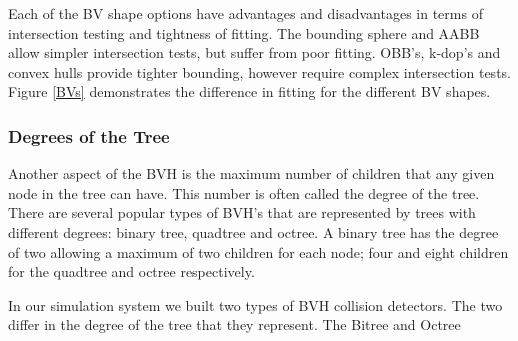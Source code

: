     Each of the BV shape options have advantages and disadvantages in terms of intersection testing and tightness of fitting. The bounding sphere and AABB allow simpler intersection tests, but suffer from poor fitting. OBB's, k-dop's and convex hulls provide tighter bounding, however require complex intersection tests. Figure \ref{BVs} demonstrates the difference in fitting for the different BV shapes.

    \subsubsection{Degrees of the Tree}
    Another aspect of the BVH is the maximum number of children that any given node in the tree can have. This number is often called the degree of the tree. There are several popular types of BVH's that are represented by trees with different degrees: binary tree, quadtree and octree. A binary tree has the degree of two allowing a maximum of two children for each node; four and eight children for the quadtree and octree respectively.

    In our simulation system we built two types of BVH collision detectors. The two differ in the degree of the tree that they represent. The Bitree and Octree

